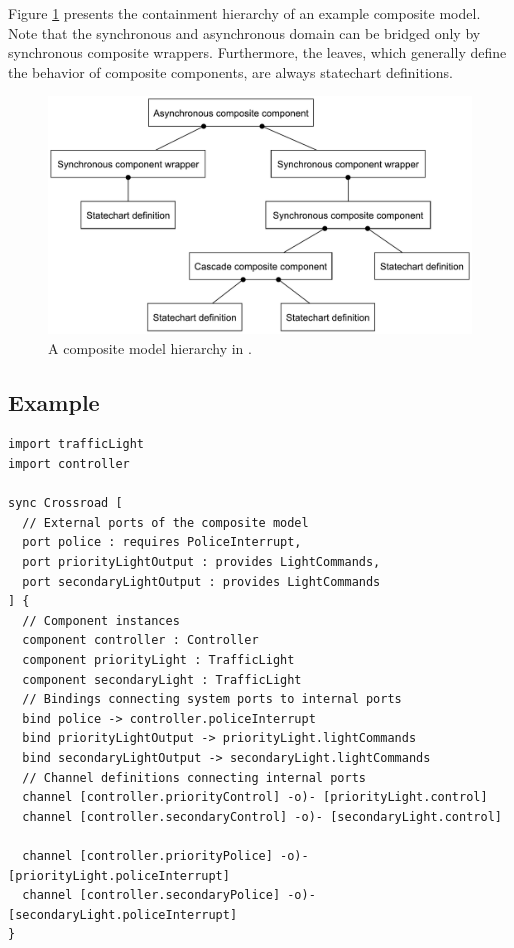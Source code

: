 Figure \ref{fig:gamma-object-tree} presents the containment hierarchy of an example composite model. Note that the synchronous and asynchronous domain can be bridged only by synchronous composite wrappers. Furthermore, the leaves, which generally define the behavior of composite components, are always statechart definitions.

\begin{figure}[htbp]
	\center
	\includegraphics[width=1.0\linewidth]{figures/gamma_object_tree.pdf}
	\caption{A composite model hierarchy in \gamma.}
	\label{fig:gamma-object-tree}
\end{figure}

\subsection{Example}

\begin{lstlisting}
import trafficLight
import controller

sync Crossroad [
  // External ports of the composite model
  port police : requires PoliceInterrupt,
  port priorityLightOutput : provides LightCommands,
  port secondaryLightOutput : provides LightCommands
] {
  // Component instances
  component controller : Controller
  component priorityLight : TrafficLight
  component secondaryLight : TrafficLight
  // Bindings connecting system ports to internal ports
  bind police -> controller.policeInterrupt
  bind priorityLightOutput -> priorityLight.lightCommands
  bind secondaryLightOutput -> secondaryLight.lightCommands
  // Channel definitions connecting internal ports
  channel [controller.priorityControl] -o)- [priorityLight.control]
  channel [controller.secondaryControl] -o)- [secondaryLight.control]

  channel [controller.priorityPolice] -o)- [priorityLight.policeInterrupt]
  channel [controller.secondaryPolice] -o)- [secondaryLight.policeInterrupt]
}
\end{lstlisting}

